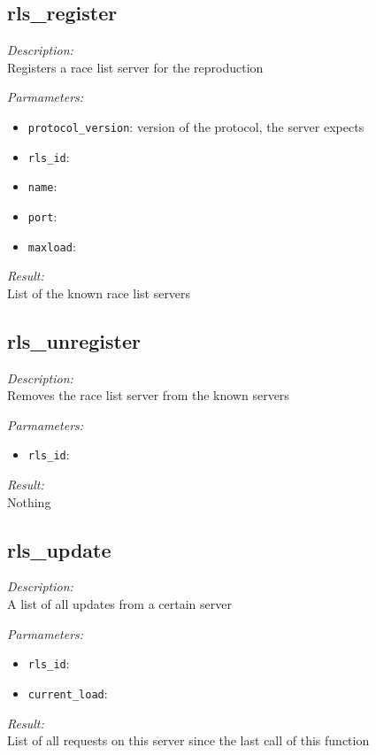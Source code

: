 \subsection{rls\_register}

\begin{description}
\item {\it Description:}\\
Registers a race list server for the reproduction
\item {\it Parmameters:}
\begin{itemize}
\item {\tt protocol\_version}: version of the protocol, the server expects
\item {\tt rls\_id}: 
\item {\tt name}: 
\item {\tt port}: 
\item {\tt maxload}: 
\end{itemize}
\item {\it Result:}\\
List of the known race list servers
\end{description}

\subsection{rls\_unregister}

\begin{description}
\item {\it Description:}\\
Removes the race list server from the known servers
\item {\it Parmameters:}
\begin{itemize}
\item {\tt rls\_id}: 
\end{itemize}
\item {\it Result:}\\
Nothing
\end{description}

\subsection{rls\_update}

\begin{description}
\item {\it Description:}\\
A list of all updates from a certain server
\item {\it Parmameters:}
\begin{itemize}
\item {\tt rls\_id}: 
\item {\tt current\_load}: 
\end{itemize}
\item {\it Result:}\\
List of all requests on this server since the last call of this function
\end{description}

